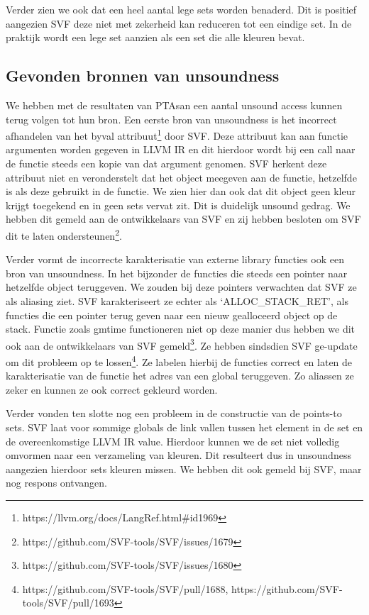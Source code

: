 \documentclass[conference]{IEEEtran}
\begin{document}
Verder zien we ook dat een heel aantal lege sets worden benaderd. Dit is positief aangezien SVF deze niet met zekerheid kan reduceren tot een eindige set. In de praktijk wordt een lege set aanzien als een set die alle kleuren bevat.

\subsection{Gevonden bronnen van unsoundness}

We hebben met de resultaten van PTAsan een aantal unsound access kunnen terug volgen tot hun bron. Een eerste bron van unsoundness is het incorrect afhandelen van het byval attribuut\footnote{https://llvm.org/docs/LangRef.html\#id1969} door SVF. Deze attribuut kan aan functie argumenten worden gegeven in LLVM IR en dit hierdoor wordt bij een call naar de functie steeds een kopie van dat argument genomen. SVF herkent deze attribuut niet en veronderstelt dat het object meegeven aan de functie, hetzelfde is als deze gebruikt in de functie. We zien hier dan ook dat dit object geen kleur krijgt toegekend en in geen sets vervat zit. Dit is duidelijk unsound gedrag. We hebben dit gemeld aan de ontwikkelaars van SVF en zij hebben besloten om SVF dit te laten ondersteunen\footnote{https://github.com/SVF-tools/SVF/issues/1679}.

Verder vormt de incorrecte karakterisatie van externe library functies ook een bron van unsoundness. In het bijzonder de functies die steeds een pointer naar hetzelfde object teruggeven. We zouden bij deze pointers verwachten dat SVF ze als aliasing ziet. SVF karakteriseert ze echter als `ALLOC\_STACK\_RET', als functies die een pointer terug geven naar een nieuw gealloceerd object op de stack. Functie zoals gmtime functioneren niet op deze manier dus hebben we dit ook aan de ontwikkelaars van SVF gemeld\footnote{https://github.com/SVF-tools/SVF/issues/1680}. Ze hebben sindsdien SVF ge-update om dit probleem op te lossen\footnote{https://github.com/SVF-tools/SVF/pull/1688, https://github.com/SVF-tools/SVF/pull/1693}. Ze labelen hierbij de functies correct en laten de karakterisatie van de functie het adres van een global teruggeven. Zo aliassen ze zeker en kunnen ze ook correct gekleurd worden. 

Verder vonden ten slotte nog een probleem in de constructie van de points-to sets. SVF laat voor sommige globals de link vallen tussen het element in de set en de overeenkomstige LLVM IR value. Hierdoor kunnen we de set niet volledig omvormen naar een verzameling van kleuren. Dit resulteert dus in unsoundness aangezien hierdoor sets kleuren missen. We hebben dit ook gemeld bij SVF, maar nog respons ontvangen.
\end{document}
